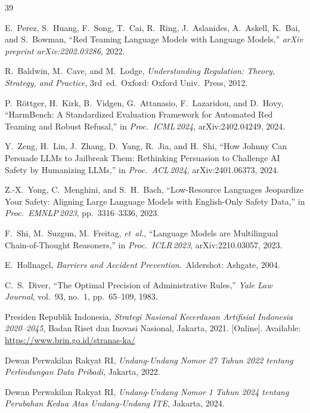 \documentclass[conference]{IEEEtran}
\begin{document}
\begin{thebibliography}{39}

E.~Perez, S.~Huang, F.~Song, T.~Cai, R.~Ring, J.~Aslanides, A.~Askell,
K.~Bai, and S.~Bowman, ``Red Teaming Language Models with Language Models,''
\textit{arXiv preprint arXiv:2202.03286}, 2022.

R.~Baldwin, M.~Cave, and M.~Lodge, \textit{Understanding Regulation: Theory,
Strategy, and Practice}, 3rd~ed.\ Oxford: Oxford Univ.\ Press, 2012.

P.~R{\"o}ttger, H.~Kirk, B.~Vidgen, G.~Attanasio, F.~Lazaridou, and D.~Hovy,
``HarmBench: A Standardized Evaluation Framework for Automated Red Teaming
and Robust Refusal,'' in \textit{Proc.\ ICML\,2024}, arXiv:2402.04249, 2024.

Y.~Zeng, H.~Lin, J.~Zhang, D.~Yang, R.~Jia, and H.~Shi, ``How Johnny Can
Persuade LLMs to Jailbreak Them: Rethinking Persuasion to Challenge AI Safety
by Humanizing LLMs,'' in \textit{Proc.\ ACL\,2024}, arXiv:2401.06373, 2024.

Z.-X.~Yong, C.~Menghini, and S.~H.~Bach, ``Low-Resource Languages Jeopardize
Your Safety: Aligning Large Language Models with English-Only Safety Data,''
in \textit{Proc.\ EMNLP\,2023}, pp.~3316--3336, 2023.

F.~Shi, M.~Suzgun, M.~Freitag, \textit{et~al.}, ``Language Models are
Multilingual Chain-of-Thought Reasoners,'' in \textit{Proc.\ ICLR\,2023},
arXiv:2210.03057, 2023.

E.~Hollnagel, \textit{Barriers and Accident Prevention}.\ Aldershot: Ashgate,
2004.

C.~S.~Diver, ``The Optimal Precision of Administrative Rules,''
\textit{Yale Law Journal}, vol.~93, no.~1, pp.~65--109, 1983.

Presiden Republik Indonesia, \textit{Strategi Nasional Kecerdasan Artifisial
Indonesia 2020--2045}, Badan Riset dan Inovasi Nasional, Jakarta, 2021.
[Online]. Available: \url{https://www.brin.go.id/stranas-ka/}

Dewan Perwakilan Rakyat RI, \textit{Undang-Undang Nomor 27 Tahun 2022 tentang
Perlindungan Data Pribadi}, Jakarta, 2022.

Dewan Perwakilan Rakyat RI, \textit{Undang-Undang Nomor 1 Tahun 2024 tentang
Perubahan Kedua Atas Undang-Undang ITE}, Jakarta, 2024.


\end{thebibliography}
\end{document}
